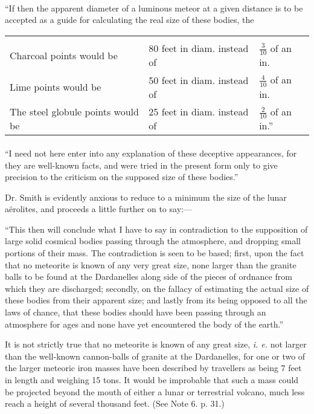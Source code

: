 \documentclass[a4paper, 12pt, oneside]{article}
\begin{document}
\paragraph{}
``If then the apparent diameter of a luminous meteor at a given distance is to be accepted as a guide for calculating the real size of these bodies, the
\begin{table}[H]
    \footnotesize
    \centering
    \begin{tabular}{l l l}
         &  &  \\ 
        Charcoal points would be & 80 feet in diam. instead of & $\frac{3}{10}$ of an in. \\
        Lime points would be & 50 feet in diam. instead of & $\frac{4}{10}$ of an in. \\
        The steel globule points would be & 25 feet in diam. instead of & $\frac{2}{10}$ of an in.'' \\
    \end{tabular}
\end{table}
\paragraph{}
``I need not here enter into any explanation of these deceptive appearances, for they are well-known facts, and were tried in the present form only to give precision to the criticism on the supposed size of these bodies.''

Dr. Smith is evidently anxious to reduce to a minimum the size of the lunar aërolites, and proceeds a little further on to say:---

``This then will conclude what I have to say in contradiction to the supposition of large solid cosmical bodies passing through the atmosphere, and dropping small portions of their mass. The contradiction is seen to be based; first, upon the fact that no meteorite is known of any very great size, none larger than the granite balls to be found at the Dardanelles along side of the pieces of ordnance from which they are discharged; secondly, on the fallacy of estimating the actual size of these bodies from their apparent size; and lastly from its being opposed to all the laws of chance, that these bodies should have been passing through an atmosphere for ages and none have yet encountered the body of the earth.''

It is not strictly true that no meteorite is known of any great size, \emph{i. e.} not larger than the well-known cannon-balls of granite at the Dardanelles, for one or two of the larger meteoric iron masses have been described by travellers as being 7 feet in length and weighing 15 tons. It would be improbable that such a mass could be projected beyond the mouth of either a lunar or terrestrial volcano, much less reach a height of several thousand feet. (See Note 6. p. 31.)
\end{document}
